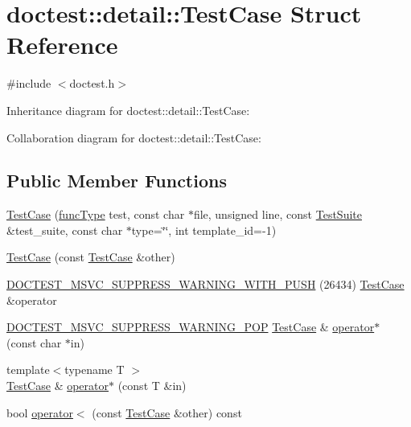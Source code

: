 \hypertarget{structdoctest_1_1detail_1_1_test_case}{}\section{doctest\+:\+:detail\+:\+:Test\+Case Struct Reference}
\label{structdoctest_1_1detail_1_1_test_case}


{\ttfamily \#include $<$doctest.\+h$>$}



Inheritance diagram for doctest\+:\+:detail\+:\+:Test\+Case\+:


Collaboration diagram for doctest\+:\+:detail\+:\+:Test\+Case\+:
\subsection*{Public Member Functions}
\begin{DoxyCompactItemize}
\item 
\hyperlink{structdoctest_1_1detail_1_1_test_case_a589d99e8322a4d830d5173545cd3dabe}{Test\+Case} (\hyperlink{namespacedoctest_1_1detail_a7b2c60631c5f4906b26acf2e6b0e6e45}{func\+Type} test, const char $\ast$file, unsigned line, const \hyperlink{structdoctest_1_1detail_1_1_test_suite}{Test\+Suite} \&test\+\_\+suite, const char $\ast$type=\char`\"{}\char`\"{}, int template\+\_\+id=-\/1)
\item 
\hyperlink{structdoctest_1_1detail_1_1_test_case_a0d8aa1f3d0cbd31f3bc4a74d9c6add23}{Test\+Case} (const \hyperlink{structdoctest_1_1detail_1_1_test_case}{Test\+Case} \&other)
\item 
\hyperlink{structdoctest_1_1detail_1_1_test_case_a3e767f89d496f2dc80ebbab72677c754}{D\+O\+C\+T\+E\+S\+T\+\_\+\+M\+S\+V\+C\+\_\+\+S\+U\+P\+P\+R\+E\+S\+S\+\_\+\+W\+A\+R\+N\+I\+N\+G\+\_\+\+W\+I\+T\+H\+\_\+\+P\+U\+SH} (26434) \hyperlink{structdoctest_1_1detail_1_1_test_case}{Test\+Case} \&operator
\item 
\hyperlink{doctest_8h_a540e6314c4b71317f3459f0117e14bc8}{D\+O\+C\+T\+E\+S\+T\+\_\+\+M\+S\+V\+C\+\_\+\+S\+U\+P\+P\+R\+E\+S\+S\+\_\+\+W\+A\+R\+N\+I\+N\+G\+\_\+\+P\+OP} \hyperlink{structdoctest_1_1detail_1_1_test_case}{Test\+Case} \& \hyperlink{structdoctest_1_1detail_1_1_test_case_a2bc7eff3ab5c26149f683f2354463cbd}{operator$\ast$} (const char $\ast$in)
\item 
{\footnotesize template$<$typename T $>$ }\\\hyperlink{structdoctest_1_1detail_1_1_test_case}{Test\+Case} \& \hyperlink{structdoctest_1_1detail_1_1_test_case_a7ff8c8e9a0e4515dbef926a835b447f9}{operator$\ast$} (const T \&in)
\item 
bool \hyperlink{structdoctest_1_1detail_1_1_test_case_a865f5906758263125b68b8d785a05ca1}{operator$<$} (const \hyperlink{structdoctest_1_1detail_1_1_test_case}{Test\+Case} \&other) const
\end{DoxyCompactItemize}
